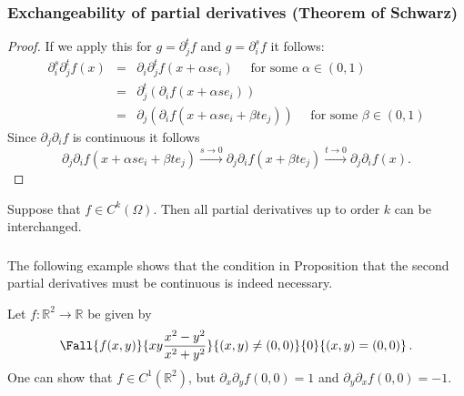  \begin{frame}[fragile] \frametitle{Exchangeability of partial derivatives (Theorem of Schwarz)}
\begin{proof}

  If we apply this for
   $g = \partial_j^t f$ and $g=\partial_i^s f$ it follows:
  \begin{eqnarray*}
    \partial_i^s \partial_j^t f(x) 
    & = & \partial_i \partial_j^t f(x+\alpha s e_i) 
    \quad \text{ for some } \alpha \in (0,1)\\
    & = & \partial_j^t (\partial_i f(x+\alpha s e_i))\\
    & = & \partial_j (\partial_i f(x+\alpha s e_i+\beta t e_j)) 
    \quad \text{ for some } \beta \in (0,1)
  \end{eqnarray*}
  Since
  $\partial_j \partial_i f$ is continuous it follows
  \[ \partial_j \partial_i f(x + \alpha s e_i + \beta t e_j)
  \xrightarrow{s \rightarrow 0} \partial_j \partial_i f(x + \beta t e_j)
  \xrightarrow{t \rightarrow 0} \partial_j \partial_i f(x).\]
\end{proof}

\begin{corollary}
Suppose that  $f \in C^k(\Omega)$. Then all partial derivatives up to order $k$ can
be interchanged.
\end{corollary}

\end{frame}




 \begin{frame}[fragile] \frametitle{}
 
The following example shows that the condition in Proposition  that the second partial derivatives must be continuous is indeed necessary.

Let $f \colon \mathbb{R}^2 \to \mathbb{R}$ be given by
\[
\Fall{f(x,y)}{x y \frac{x^2 -y^2}{x^2 + y^2} }{(x,y) \not=(0,0)}{0}{(x,y)=(0,0)}\,.
\]
One can show that $f \in C^1 (\mathbb{R}^2)$, but $\partial_x \partial_y f(0,0)=1$ and $\partial_y \partial_x f(0,0)=-1$.


\end{frame}

